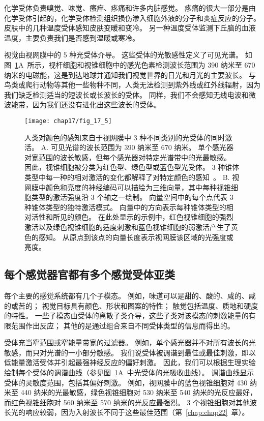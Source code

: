 化学受体负责嗅觉、味觉、瘙痒、疼痛和许多内脏感觉。 
疼痛的很大一部分是由化学受体引起的，化学受体检测组织损伤渗入细胞外液的分子和炎症反应的分子。 
皮肤中的几种温度受体感知皮肤变暖和变冷。 
另一种温度受体监测下丘脑的血液温度，主要负责我们是否感到温暖或寒冷。


视觉由视网膜中的 5 种光受体介导。
这些受体的光敏感性定义了可见光谱。 
如图~\ref{fig:17_5}A~所示，视杆细胞和视锥细胞中的感光色素检测波长范围为 390 纳米至 670 纳米的电磁能，这是到达地球并通知我们视觉世界的日光和月光的主要波长。
与鸟类或爬行动物等其他一些物种不同，人类无法检测到紫外线或红外线辐射，因为我们缺乏检测适当的短波长或长波长的受体。
同样，我们不会感知无线电波和微波能带，因为我们还没有进化出这些波长的受体。


\begin{figure}[htbp]
	\centering
	\texttt{[image: chap17/fig\_17\_5]}
	\caption{人类对颜色的感知来自于视网膜中 3 种不同类别的光受体的同时激活。
		A. 可见光谱的波长范围为 390 纳米至 670 纳米。
		单个感光器对宽范围的波长敏感，但每个感光器对特定光谱带中的光最敏感。
		因此，视锥细胞被分类为红色型、绿色型或蓝色型光受体。
		3 种锥体类型中每一种的相对激活的变化都解释了对特定颜色的感知~\cite{dowling1987retina}。
		B. 视网膜中颜色和亮度的神经编码可以描绘为三维向量，其中每种视锥细胞类型的激活强度沿 3 个轴之一绘制。
		向量空间中的每个点代表 3 种锥体类型的独特激活模式。
		向量中的方向表示每种锥体类型的相对活性和所见的颜色。
		在此处显示的示例中，红色视锥细胞的强烈激活以及绿色视锥细胞的适度刺激和蓝色视锥细胞的弱激活产生了黄色的感知。
		从原点到该点的向量长度表示视网膜该区域的光强度或亮度。}
	\label{fig:17_5}
\end{figure}



\subsection{每个感觉器官都有多个感觉受体亚类}

每个主要的感觉系统都有几个子模态。 
例如，味道可以是甜的、酸的、咸的、咸的或苦的； 
视觉目标具有颜色、形状和图案的特性； 
触觉包括温度、质地和硬度的特性。 
一些子模态由受体的离散子类介导，这些子类对该模态的刺激能量的有限范围作出反应； 
其他的是通过组合来自不同受体类型的信息而得出的。


受体充当窄范围或窄能量带宽的过滤器。 
例如，单个感光器并不对所有波长的光敏感，而只对光谱的一小部分敏感。 
我们说受体被调谐到最佳或最佳刺激，即以低能量激活受体并引起最强神经反应的偏好刺激。
因此，我们可以根据生理实验绘制每个受体的调谐曲线（参见图~\ref{fig:17_5}A~中光受体的光吸收曲线）。
调谐曲线显示受体的灵敏度范围，包括其偏好刺激。
例如，视网膜中的蓝色视锥细胞对 430 纳米至 440 纳米的光最敏感，绿色视锥细胞对 530 纳米至 540 纳米的光反应最好，而红色视锥细胞对 560 纳米至 570 纳米的光反应最强烈。 
3 个视锥细胞对其他波长光的响应较弱，因为入射波长不同于这些最佳范围（第~\ref{chap:chap22}~章）。


